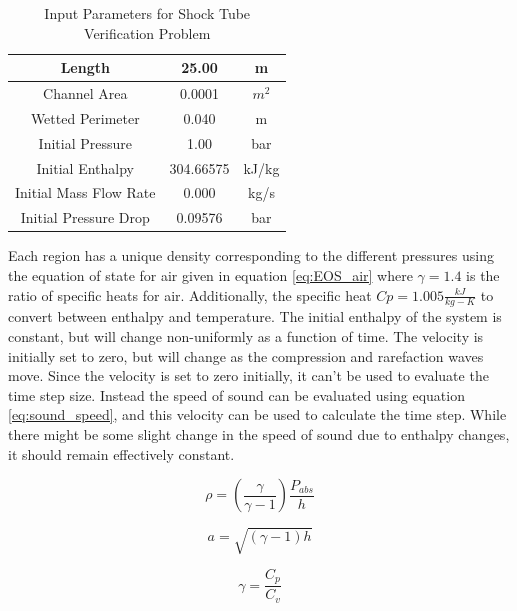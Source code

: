     \begin{table}[!h]
    	\center
    	\label{table:ST_Params}
    	\caption{Input Parameters for Shock Tube Verification Problem}
    	\begin{tabular}{|c|c|c|}
    		\hline
	    	Length 	  				&  25.00	& m 		\\ \hline 
	    	Channel Area			&  0.0001	& $m^{2}$	\\ \hline
	    	Wetted Perimeter		&  0.040	& m			\\ \hline
	    	Initial Pressure  		&  1.00		& bar		\\ \hline
	    	Initial Enthalpy		&  304.66575& kJ/kg		\\ \hline
	    	Initial Mass Flow Rate 	&  0.000	& kg/s		\\ \hline
	    	Initial Pressure Drop	&  0.09576  & bar 		\\ \hline
    	\end{tabular}
    \end{table}    
    
    Each region has a unique density corresponding to the different pressures
    using the equation of state for air given in equation \ref{eq:EOS_air} where $\gamma
    = 1.4$ is the ratio of specific heats for air. Additionally, the specific
    heat $Cp = 1.005 \frac{kJ}{kg-K}$ to convert between enthalpy and
    temperature. The initial enthalpy of the system is constant, but will change
    non-uniformly as a function of time. The velocity is initially set to zero,
    but will change as the compression and rarefaction waves move. Since the
    velocity is set to zero initially, it can't be used to evaluate the time
    step size. Instead the speed of sound can be evaluated using equation
    \ref{eq:sound_speed}, and this velocity can be used to calculate the time
    step. While there might be some slight change in the speed of sound due to
    enthalpy changes, it should remain effectively constant.
    
    \begin{equation}
    \label{eq:EOS_air}
    	\rho = \left( \frac{\gamma}{\gamma - 1} \right) \frac{P_{abs}}{h} 
    \end{equation}
    
    \begin{equation}
    \label{eq:sound_speed}
    a = \sqrt{ \left( \gamma - 1 \right) h }
    \end{equation}
    
    \begin{equation}
    \gamma = \frac{C_{p}}{C_{v}}
    \end{equation}
    
